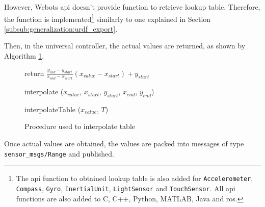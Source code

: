 However, Webots \ac{api} doesn't provide function to retrieve lookup table.
Therefore, the function is implemented\footnote{The \ac{api} function to obtained lookup table is also added for \texttt{Accelerometer}, \texttt{Compass}, \texttt{Gyro}, \texttt{InertialUnit}, \texttt{LightSensor} and \texttt{TouchSensor}.
All \ac{api} functions are also added to C, C++, Python, MATLAB, Java and \ac{ros}.} similarly to one explained in Section \ref{subsub:generalization:urdf_export}.

Then, in the universal controller, the actual values are returned, as shown by Algorithm \ref{fig:generalization:interopolation}.

\begin{figure}[H]
    \begin{minipage}{\linewidth}
    \begin{procedure}[H]
        return $ \frac{y_{end} - y_{start}}{x_{end} - x_{start}} (x_{value} - x_{start}) + y_{start}
 $ \;
        \caption{interpolate ($x_{value}$, $x_{start}$, $y_{start}$, $x_{end}$, $y_{end}$)}
    \end{procedure}
    \end{minipage}
    \begin{minipage}{\linewidth}
    \begin{procedure}[H]


        \caption{interpolateTable ($x_{value}$, $T$)}
    \end{procedure}
    \end{minipage}
\caption{Procedure used to interpolate table}
\label{fig:generalization:interopolation}
\end{figure}

Once actual values are obtained, the values are packed into messages of type \texttt{sensor\_msgs/Range} and published.

